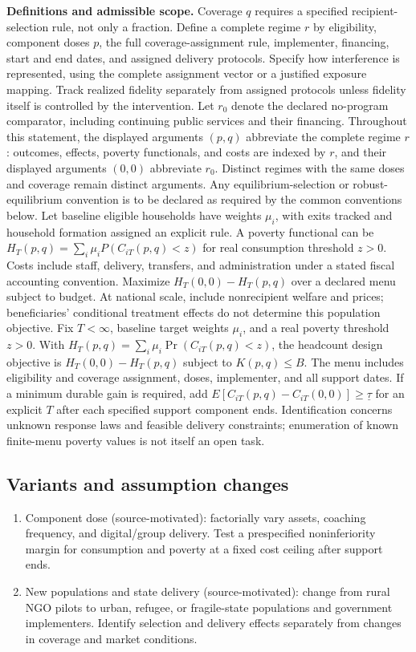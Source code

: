 \documentclass[11pt,a4paper]{article}
\begin{document}
\textbf{Definitions and admissible scope.} Coverage \(q\) requires a specified recipient-selection rule, not only a fraction. Define a complete regime \(r\) by eligibility, component doses \(p\), the full coverage-assignment rule, implementer, financing, start and end dates, and assigned delivery protocols. Specify how interference is represented, using the complete assignment vector or a justified exposure mapping. Track realized fidelity separately from assigned protocols unless fidelity itself is controlled by the intervention. Let \(r_0\) denote the declared no-program comparator, including continuing public services and their financing. Throughout this statement, the displayed arguments \((p,q)\) abbreviate the complete regime \(r\): outcomes, effects, poverty functionals, and costs are indexed by \(r\), and their displayed arguments \((0,0)\) abbreviate \(r_0\). Distinct regimes with the same doses and coverage remain distinct arguments. Any equilibrium-selection or robust-equilibrium convention is to be declared as required by the common conventions below. Let baseline eligible households have weights \(\mu_i\), with exits tracked and household formation assigned an explicit rule. A poverty functional can be \(H_T(p,q)=\sum_i\mu_iP(C_{iT}(p,q)<z)\) for real consumption threshold \(z>0\). Costs include staff, delivery, transfers, and administration under a stated fiscal accounting convention. Maximize \(H_T(0,0)-H_T(p,q)\) over a declared menu subject to budget. At national scale, include nonrecipient welfare and prices; beneficiaries' conditional treatment effects do not determine this population objective. Fix \(T<\infty\), baseline target weights \(\mu_i\), and a real poverty threshold \(z>0\). With \(H_T(p,q)=\sum_i\mu_i\Pr(C_{iT}(p,q)<z)\), the headcount design objective is \(H_T(0,0)-H_T(p,q)\) subject to \(K(p,q)\le B\). The menu includes eligibility and coverage assignment, doses, implementer, and all support dates. If a minimum durable gain is required, add \(E[C_{iT}(p,q)-C_{iT}(0,0)]\ge\underline\tau\) for an explicit \(T\) after each specified support component ends. Identification concerns unknown response laws and feasible delivery constraints; enumeration of known finite-menu poverty values is not itself an open task.
\subsection*{Variants and assumption changes}
\begin{enumerate}
\item Component dose (source-motivated): factorially vary assets, coaching frequency, and digital/group delivery. Test a prespecified noninferiority margin for consumption and poverty at a fixed cost ceiling after support ends.
\item New populations and state delivery (source-motivated): change from rural NGO pilots to urban, refugee, or fragile-state populations and government implementers. Identify selection and delivery effects separately from changes in coverage and market conditions.
\end{enumerate}
\end{document}
